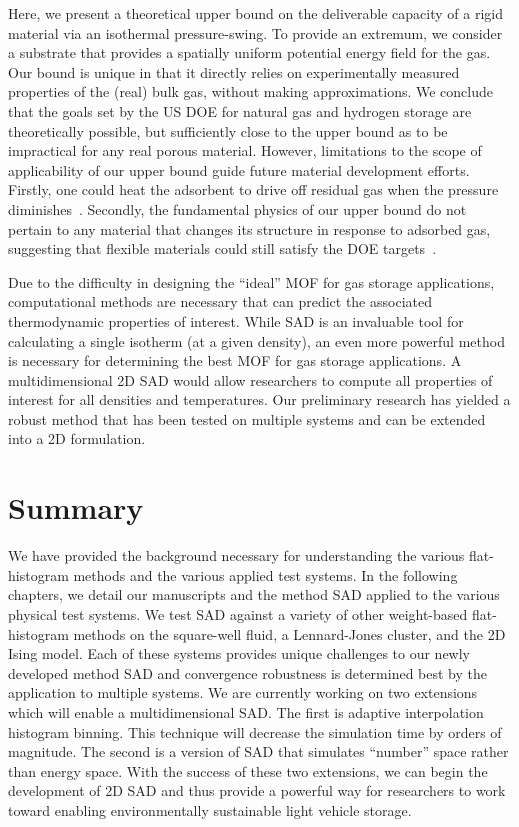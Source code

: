 Here, we present a theoretical upper bound on the deliverable capacity of a
rigid material via an isothermal pressure-swing. To provide an extremum, we
consider a substrate that provides a spatially uniform potential energy field
for the gas. Our bound is unique in that it directly relies on experimentally
measured properties of the (real) bulk gas, without making approximations.
We conclude that the goals set by the US DOE for natural gas and hydrogen
storage are theoretically possible, but sufficiently close to the upper bound
as to be impractical for any real porous material. However, limitations to the
scope of applicability of our upper bound guide future material development 
efforts. Firstly, one could heat the adsorbent to drive off residual gas when
the pressure diminishes~\cite{gomez2014exploring}. Secondly, the fundamental
physics of our upper bound do not pertain to any material that changes its
structure in response to adsorbed gas, suggesting that flexible materials could
still satisfy the DOE targets~\cite{schneemann2014flexible, choi2008broadly, mason2015methane}.

Due to the difficulty in designing the ``ideal'' MOF for gas storage
applications, computational methods are necessary that can predict the
associated thermodynamic properties of interest. While SAD is an invaluable tool
for calculating a single isotherm (at a given density), an even more powerful
method is necessary for determining the best MOF for gas storage applications.
A multidimensional 2D SAD would allow researchers to compute all properties of
interest for all densities and temperatures. Our preliminary research has
yielded a robust method that has been tested on multiple systems and can be
extended into a 2D formulation. 

\section{Summary}
We have provided the background necessary for understanding the various
flat-histogram methods and the various applied test systems. In the following
chapters, we detail our manuscripts and the method SAD applied to the various
physical test systems. We test SAD against a variety of other weight-based
flat-histogram methods on the square-well fluid, a Lennard-Jones cluster, and
the 2D Ising model. Each of these systems provides unique challenges to our
newly developed method SAD and convergence robustness is determined best by the
application to multiple systems.
We are currently working on two extensions which will enable a multidimensional
SAD. The first is adaptive interpolation histogram binning. This technique will
decrease the simulation time by orders of magnitude. The second is a version of
SAD that simulates ``number'' space rather than energy space. With the success
of these two extensions, we can begin the development of 2D SAD and thus provide
a powerful way for researchers to work toward enabling environmentally
sustainable light vehicle storage.